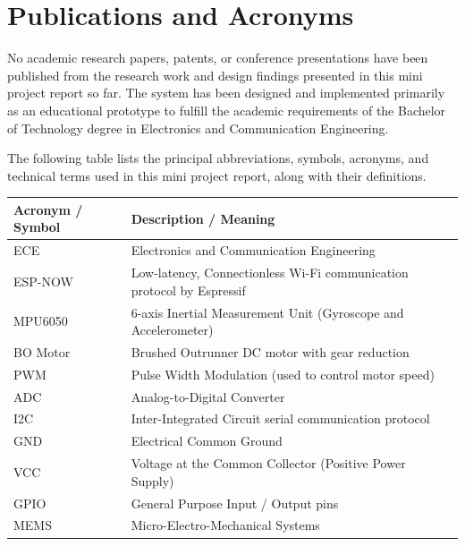\documentclass[12pt,a4paper,oneside]{report}
\begin{document}
\chapter*{Publications and Acronyms}
\vspace{0.1in}
No academic research papers, patents, or conference presentations have been published from the research work and design findings presented in this mini project report so far. The system has been designed and implemented primarily as an educational prototype to fulfill the academic requirements of the Bachelor of Technology degree in Electronics and Communication Engineering.\par
\medskip
The following table lists the principal abbreviations, symbols, acronyms, and technical terms used in this mini project report, along with their definitions.\par
\vspace{0.1in}
\begin{center}
\fontsize{9.5}{11}\selectfont
\begin{tabular}{|C{3.0cm}|C{11.5cm}|}
\hline
\textbf{Acronym / Symbol} & \textbf{Description / Meaning} \\ \hline
ECE & Electronics and Communication Engineering \\ \hline
ESP-NOW & Low-latency, Connectionless Wi-Fi communication protocol by Espressif \\ \hline
MPU6050 & 6-axis Inertial Measurement Unit (Gyroscope and Accelerometer) \\ \hline
BO Motor & Brushed Outrunner DC motor with gear reduction \\ \hline
PWM & Pulse Width Modulation (used to control motor speed) \\ \hline
ADC & Analog-to-Digital Converter \\ \hline
I2C & Inter-Integrated Circuit serial communication protocol \\ \hline
GND & Electrical Common Ground \\ \hline
VCC & Voltage at the Common Collector (Positive Power Supply) \\ \hline
GPIO & General Purpose Input / Output pins \\ \hline
MEMS & Micro-Electro-Mechanical Systems \\ \hline
\end{tabular}
\vspace{0.05in}
\label{tab:acronyms}
\end{center}
\clearpage
\end{document}
